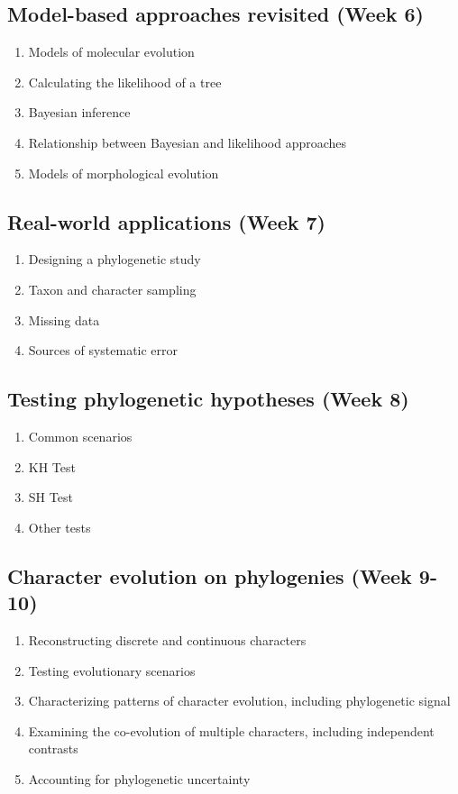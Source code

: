 \documentclass[12pt]{article}
\begin{document}
\subsection*{Model-based approaches revisited \textnormal{\small{(Week 6)}}}

\begin{enumerate}
\item Models of molecular evolution
\item Calculating the likelihood of a tree
\item Bayesian inference
\item Relationship between Bayesian and likelihood approaches
\item Models of morphological evolution
\end{enumerate}

\subsection*{Real-world applications \textnormal{\small{(Week 7)}}}

\begin{enumerate}
\item Designing a phylogenetic study
\item Taxon and character sampling
\item Missing data
\item Sources of systematic error
\end{enumerate}


\subsection*{Testing phylogenetic hypotheses \textnormal{\small{(Week 8)}}}

\begin{enumerate}
\item Common scenarios
\item KH Test
\item SH Test
\item Other tests
\end{enumerate}


\subsection*{Character evolution on phylogenies \textnormal{\small{(Week 9-10)}}}

\begin{enumerate}
\item Reconstructing discrete and continuous characters
\item Testing evolutionary scenarios
\item Characterizing patterns of character evolution, including phylogenetic signal
\item Examining the co-evolution of multiple characters, including independent contrasts
\item Accounting for phylogenetic uncertainty
\end{enumerate}
\end{document}
